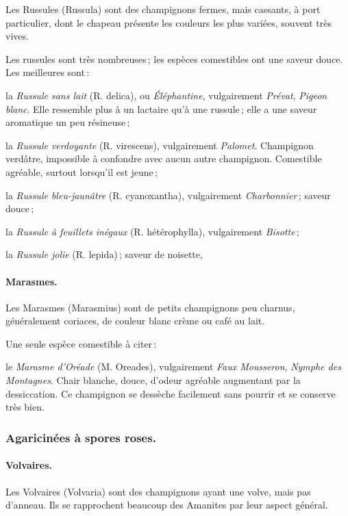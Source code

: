 Les Russules (Russula) sont des champignons fermes, mais cassants, à port
particulier, dont le chapeau présente les couleurs les plus variées, souvent
très vives.

Les russules sont très nombreuses ; les espèces comestibles ont une saveur
douce. Les meilleures sont :

la \textit{Russule sans lait} (R. delica), ou \textit{Éléphantine},
vulgairement \textit{Prévat}, \textit{Pigeon blanc}. Elle ressemble plus à un
lactaire qu'à une russule ; elle a une saveur aromatique un peu résineuse ;

la \textit{Russule verdoyante} (R. virescens), vulgairement \textit{Palomet}.
Champignon verdâtre, impossible à confondre avec aucun autre champignon.
Comestible agréable, surtout lorsqu'il est jeune ;

la \textit{Russule bleu-jaunâtre} (R. cyanoxantha), vulgairement
\textit{Charbonnier} ; saveur douce ;

la \textit{Russule à feuillets inégaux} (R. hétérophylla), vulgairement
\textit{Bisotte} ;

la \textit{Russule jolie} (R. lepida) ; saveur de noisette,

\paragraph{Marasmes.}

Les Marasmes (Marasmius) sont de petits champignons peu charnus, généralement
coriaces, de couleur blanc crème ou café au lait.

Une seule espèce comestible à citer :

le \textit{Marasme d'Oréade} (M. Oreades), vulgairement \textit{Faux
Mousseron}, \textit{Nymphe des Montagnes}. Chair blanche, douce, d'odeur
agréable augmentant par la dessiccation. Ce champignon se dessèche facilement
sans pourrir et se conserve très bien.

\subsubsection*{\centering \small\sc Agaricinées à spores roses.}

\paragraph{Volvaires.}

Les Volvaires (Volvaria) sont des champignons ayant une volve, mais pas
d'anneau. Ils se rapprochent beaucoup des Amanites par leur aspect général.

